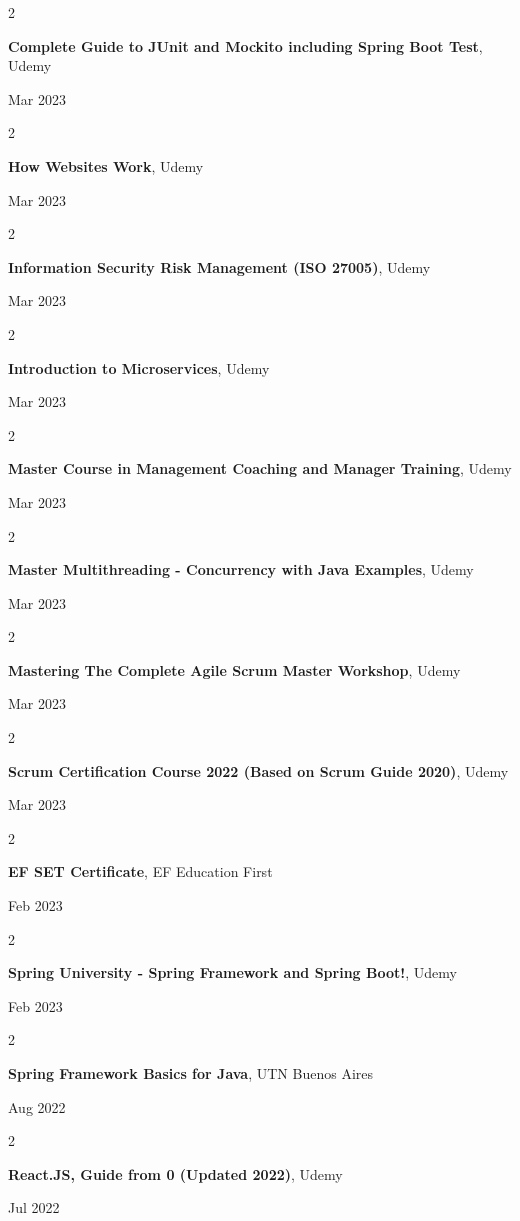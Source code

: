 \documentclass[10pt, letterpaper]{article}
\newenvironment{twocolentry}[2][]{
    \onecolentry
    \def\secondColumn{#2}
    \setcolumnwidth{\fill, 4.5 cm}
    \begin{paracol}{2}
}{
    \switchcolumn \raggedleft \secondColumn
    \end{paracol}
    \endonecolentry
} %
\begin{document}
    \begin{twocolentry}{
            Mar 2023
        }
        \textbf{Complete Guide to JUnit and Mockito including Spring Boot Test}, Udemy
    \end{twocolentry}
    \begin{twocolentry}{
            Mar 2023
        }
        \textbf{How Websites Work}, Udemy
    \end{twocolentry}
    \begin{twocolentry}{
            Mar 2023
        }
        \textbf{Information Security Risk Management (ISO 27005)}, Udemy
    \end{twocolentry}
    \begin{twocolentry}{
            Mar 2023
        }
        \textbf{Introduction to Microservices}, Udemy
    \end{twocolentry}
    \begin{twocolentry}{
            Mar 2023
        }
        \textbf{Master Course in Management Coaching and Manager Training}, Udemy
    \end{twocolentry}
    \begin{twocolentry}{
            Mar 2023
        }
        \textbf{Master Multithreading - Concurrency with Java Examples}, Udemy
    \end{twocolentry}
    \begin{twocolentry}{
            Mar 2023
        }
        \textbf{Mastering The Complete Agile Scrum Master Workshop}, Udemy
    \end{twocolentry}
    \begin{twocolentry}{
            Mar 2023
        }
        \textbf{Scrum Certification Course 2022 (Based on Scrum Guide 2020)}, Udemy
    \end{twocolentry}
    \begin{twocolentry}{
            Feb 2023
        }
        \textbf{EF SET Certificate}, EF Education First
    \end{twocolentry}
    \begin{twocolentry}{
            Feb 2023
        }
        \textbf{Spring University - Spring Framework and Spring Boot!}, Udemy
    \end{twocolentry}
    \begin{twocolentry}{
            Aug 2022
        }
        \textbf{Spring Framework Basics for Java}, UTN Buenos Aires
    \end{twocolentry}
    \begin{twocolentry}{
            Jul 2022
        }
        \textbf{React.JS, Guide from 0 (Updated 2022)}, Udemy
    \end{twocolentry}
\end{document}

